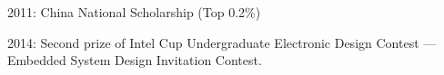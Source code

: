 \begin{zitemize}
\item 2011: China National Scholarship (Top 0.2\%)
\item 2014: Second prize of Intel Cup Undergraduate Electronic Design Contest --- Embedded System Design Invitation Contest.
\end{zitemize}